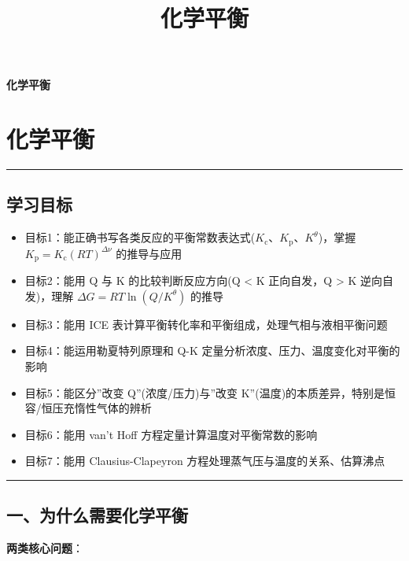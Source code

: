 \documentclass[a4paper,11pt]{ctexart}
\title{化学平衡}
\date{}
\providecommand{\tightlist}{\setlength{\itemsep}{0pt}\setlength{\parskip}{0pt}}
\newcommand{\箭}{\ensuremath{\rightarrow}}
\newcommand{\左箭}{\ensuremath{\leftarrow}}
\newcommand{\上箭}{\ensuremath{\uparrow}}
\newcommand{\下箭}{\ensuremath{\downarrow}}
\newcommand{\衡}{\ensuremath{\rightleftharpoons}}
\newcommand{\双箭}{\ensuremath{\leftrightarrow}}
\newcommand{\约等于}{\ensuremath{\approx}}
\newcommand{\小于等于}{\ensuremath{\leq}}
\newcommand{\大于等于}{\ensuremath{\geq}}
\newcommand{\不等于}{\ensuremath{\neq}}
\newcommand{\西格马}{\ensuremath{\sigma}}
\newcommand{\派}{\ensuremath{\pi}}
\begin{document}
\thispagestyle{plain}
\begin{center}
{\bfseries 化学平衡\par}
\end{center}
\vspace{1em}
\section{化学平衡}\label{ux5316ux5b66ux5e73ux8861}

\begin{center}\rule{0.5\linewidth}{0.5pt}\end{center}

\subsection{学习目标}\label{ux5b66ux4e60ux76eeux6807}

\begin{itemize}
\tightlist
\item
  目标1：能正确书写各类反应的平衡常数表达式(\(K_{\mathrm c}\)、\(K_{\mathrm p}\)、\(K^\theta\))，掌握 \(K_{\mathrm p} = K_{\mathrm c}(RT)^{\Delta\nu}\) 的推导与应用
\item
  目标2：能用 Q 与 K 的比较判断反应方向(Q \textless{} K 正向自发，Q \textgreater{} K 逆向自发)，理解 \(\Delta G = RT \ln(Q/K^\theta)\) 的推导
\item
  目标3：能用 ICE 表计算平衡转化率和平衡组成，处理气相与液相平衡问题
\item
  目标4：能运用勒夏特列原理和 Q-K 定量分析浓度、压力、温度变化对平衡的影响
\item
  目标5：能区分''改变 Q''(浓度/压力)与''改变 K''(温度)的本质差异，特别是恒容/恒压充惰性气体的辨析
\item
  目标6：能用 van't Hoff 方程定量计算温度对平衡常数的影响
\item
  目标7：能用 Clausius-Clapeyron 方程处理蒸气压与温度的关系、估算沸点
\end{itemize}

\begin{center}\rule{0.5\linewidth}{0.5pt}\end{center}

\subsection{一、为什么需要化学平衡}\label{ux4e00ux4e3aux4ec0ux4e48ux9700ux8981ux5316ux5b66ux5e73ux8861}

\textbf{两类核心问题}：
\end{document}
